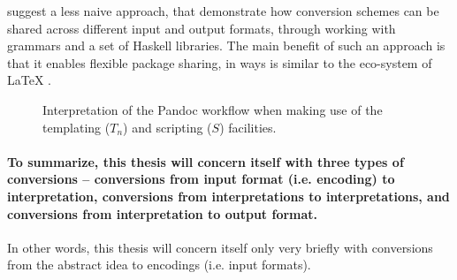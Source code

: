 \documentclass{scrreprt}
\begin{document}
\citet{krijnen} suggest a less naive approach, that demonstrate how conversion schemes can be shared across different input and output formats, through working with grammars and a set of Haskell libraries. The main benefit of such an approach is that it enables flexible package sharing, in ways is similar to the eco-system of \LaTeX{} \citep{krijnen}.



\begin{figure}[h]
    \centering


    \caption{Interpretation of the Pandoc workflow when making use of the templating ($T_n$) and scripting ($S$) facilities.}
    \label{fig:interpretation-of-pandoc}
  \end{figure}



\paragraph{To summarize, this thesis will concern itself with three types of conversions -- conversions from input format (i.e. encoding) to interpretation, conversions from interpretations to interpretations, and conversions from interpretation to output format.} In other words, this thesis will concern itself only very briefly with conversions from the abstract idea to encodings (i.e. input formats). 
\end{document}
